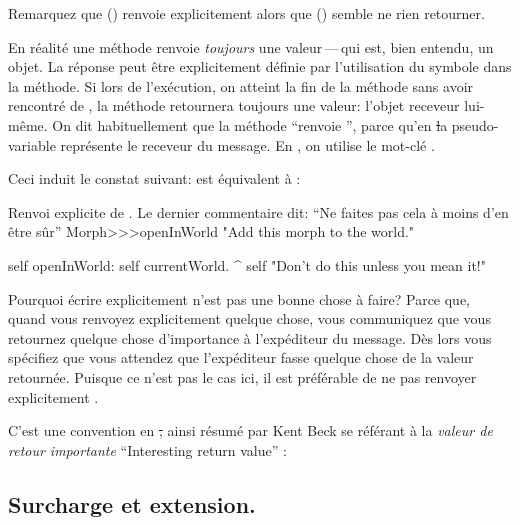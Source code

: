 \documentclass[a4paper,10pt,twoside]{book}
\begin{document}
Remarquez que  () renvoie explicitement  alors que  () semble ne rien retourner.

En réalité une méthode renvoie \emph{toujours} une valeur\,---\,qui est, bien entendu, un objet.
La réponse peut être explicitement définie par l'utilisation du symbole \ct{^} dans la méthode. Si lors de l'exécution, on atteint la fin de la méthode sans avoir rencontré de \ct{^}, la méthode retournera toujours une valeur: l'objet receveur lui-même.
On dit habituellement que la méthode ``renvoie \self'', parce qu'en
\st la pseudo-variable \self représente le receveur du message. En , on utilise le mot-clé .

Ceci induit le constat suivant:  est équivalent à \mbox{:}

\begin{method}[openInWorldReturnSelf]{Renvoi explicite de \mbox{\self.} Le dernier commentaire dit: ``Ne faites pas cela à moins d'en être sûr''}
Morph>>>openInWorld
	"Add this morph to the world."

  self openInWorld: self currentWorld.
	^ self		"Don't do this unless you mean it!"
\end{method} %

Pourquoi écrire  explicitement n'est pas une bonne chose à faire?
Parce que, quand vous renvoyez explicitement quelque chose, vous communiquez
que vous retournez quelque chose d'importance à l'expéditeur du message.
Dès lors vous spécifiez que vous attendez que l'expéditeur fasse quelque chose de la valeur retournée.
Puisque ce n'est pas le cas ici, il est préférable de ne pas renvoyer explicitement \self.

C'est une convention en \st, ainsi résumé par Kent Beck se référant à la \emph{valeur de retour importante} ``Interesting return value'' \cite{Beck97a}:


\subsection{Surcharge et extension.}
\end{document}

